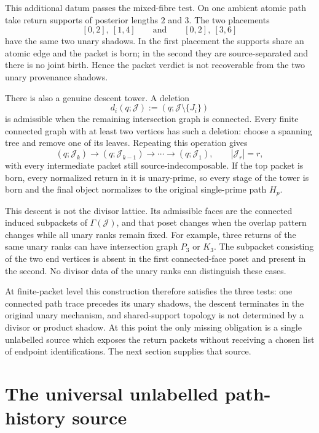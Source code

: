 \documentclass[11pt]{article}
\begin{document}
This additional datum passes the mixed-fibre test.  On one ambient atomic path
take return supports of posterior lengths \(2\) and \(3\).  The two placements
\[
[0,2],\ [1,4]
\qquad\text{and}\qquad
[0,2],\ [3,6]
\]
have the same two unary shadows.  In the first placement the supports share an
atomic edge and the packet is born; in the second they are source-separated and
there is no joint birth.  Hence the packet verdict is not recoverable from the
two unary provenance shadows.

There is also a genuine descent tower.  A deletion
\[
d_i(q;\mathcal J):=(q;\mathcal J\setminus\{J_i\})
\]
is admissible when the remaining intersection graph is connected.  Every
finite connected graph with at least two vertices has such a deletion: choose
a spanning tree and remove one of its leaves.  Repeating this operation gives
\[
(q;\mathcal J_k)
\longrightarrow
(q;\mathcal J_{k-1})
\longrightarrow\cdots\longrightarrow
(q;\mathcal J_1),
\qquad |\mathcal J_r|=r,
\]
with every intermediate packet still source-indecomposable.  If the top packet
is born, every normalized return in it is unary-prime, so every stage of the
tower is born and the final object normalizes to the original single-prime
path \(H_p\).

This descent is not the divisor lattice.  Its admissible faces are the
connected induced subpackets of \(\Gamma(\mathcal J)\), and that poset changes
when the overlap pattern changes while all unary ranks remain fixed.  For
example, three returns of the same unary ranks can have intersection graph
\(P_3\) or \(K_3\).  The subpacket consisting of the two end vertices is absent
in the first connected-face poset and present in the second.  No divisor data
of the unary ranks can distinguish these cases.

At finite-packet level this construction therefore satisfies the three tests:
one connected path trace precedes its unary shadows, the descent terminates in
the original unary mechanism, and shared-support topology is not determined by
a divisor or product shadow.  At this point the only missing obligation is a
single unlabelled source which exposes the return packets without receiving a
chosen list of endpoint identifications.  The next section supplies that
source.

\section{The universal unlabelled path-history source}
\end{document}
